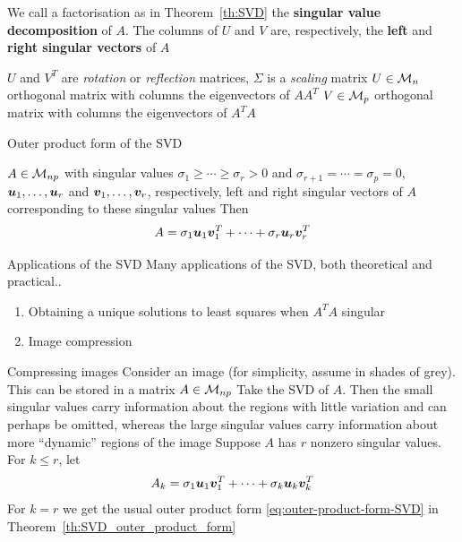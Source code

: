 \documentclass[aspectratio=169]{beamer}\usepackage[]{graphicx}\usepackage[]{xcolor}
\begin{document}
\begin{frame}
\begin{importantdefinition}
We call a factorisation as in Theorem~\ref{th:SVD} the \textbf{singular value decomposition} of $A$. The columns of $U$ and $V$ are, respectively, the \textbf{left} and \textbf{right singular vectors} of $A$
\end{importantdefinition}
\vfill
$U$ and $V^T$ are \emph{rotation} or \emph{reflection} matrices, $\Sigma$ is a \emph{scaling} matrix
\vfill
$U\in\mathcal{M}_n$ orthogonal matrix with columns the eigenvectors of $AA^T$
\vfill
$V\in\mathcal{M}_p$ orthogonal matrix with columns the eigenvectors of $A^TA$
\end{frame}


\begin{frame}{Outer product form of the SVD}
\begin{theorem}
\label{th:SVD_outer_product_form}
$A\in\mathcal{M}_{np}$ with singular values $\sigma_1\geq\cdots\geq\sigma_r>0$ and $\sigma_{r+1}=\cdots=\sigma_p=0$, $\bm{u}_1,\ldots,\bm{u}_r$ and $\bm{v}_1,\ldots,\bm{v}_r$, respectively, left and right singular vectors of $A$ corresponding to these singular values
\vskip0.5cm
Then 
\begin{equation}\label{eq:outer-product-form-SVD}
A=\sigma_1\bm{u}_1\bm{v}_1^T+\cdots+\sigma_r\bm{u}_r\bm{v}_r^T
\end{equation}
\end{theorem}
\end{frame}



\begin{frame}{Applications of the SVD}
Many applications of the SVD, both theoretical and practical..
\vfill
\begin{enumerate}
\item Obtaining a unique solutions to least squares when $A^TA$ singular
\vfill
\item Image compression
\end{enumerate}
\end{frame}



\begin{frame}{Compressing images}
Consider an image (for simplicity, assume in shades of grey). 
This can be stored in a matrix $A\in\mathcal{M}_{np}$
\vfill
Take the SVD of $A$. Then the small singular values carry information about the regions with little variation and can perhaps be omitted, whereas the large singular values carry information about more ``dynamic'' regions of the image
\vfill
Suppose $A$  has $r$ nonzero singular values. For $k\leq r$, let
\[
A_k = \sigma_1\bm{u}_1\bm{v}_1^T+\cdots+\sigma_k\bm{u}_k\bm{v}_k^T
\]
\vfill
For $k=r$ we get the usual outer product form \eqref{eq:outer-product-form-SVD} in Theorem~\ref{th:SVD_outer_product_form}
\end{frame}
\end{document}
